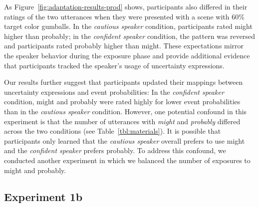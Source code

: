 \documentclass[lucida,biblatex]{sp} %
\begin{document}
As Figure~\ref{fig:adaptation-results-prod} shows, participants also differed in their ratings of the two utterances when they were presented with a scene with 60\% target color gumballs. In the \emph{cautious speaker} condition, participants rated {\sc might} higher than {\sc probably}; in the \emph{confident speaker} condition, the pattern was reversed and participants rated {\sc probably} higher than {\sc might}. These expectations mirror the speaker behavior during the exposure phase and provide additional evidence that participants tracked the speaker's usage of uncertainty expressions. 


Our results further suggest that participants updated their mappings between uncertainty expressions and event probabilities: In the {\it confident speaker} condition, {\sc might} and {\sc probably} were rated highly for lower event probabilities than in the {\it cautious speaker} condition. However, one potential confound in this experiment is that the number of utterances with \textit{might} and \textit{probably} differed across the two conditions (see Table~\ref{tbl:materials}). It is possible that participants only learned that the {\it cautious speaker} overall prefers to use {\sc might} and the {\it confident speaker} prefers {\sc probably}. To address this confound, we conducted another experiment in which we balanced the number of exposures to {\sc might} and {\sc probably}.

\subsection{Experiment 1b}
\end{document}

